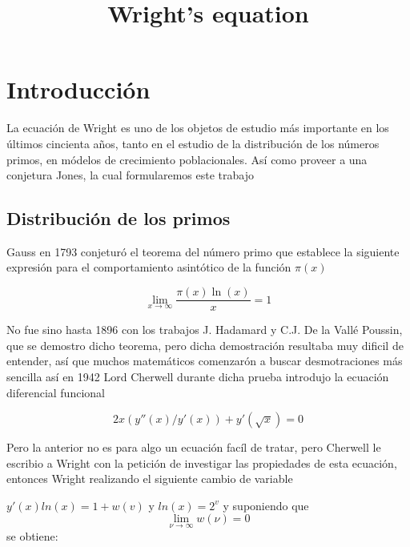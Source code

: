 \documentclass[11pt]{article}
\title{Wright's equation}
\begin{document}
    
    
    \maketitle
    
    

    
    \hypertarget{introducciuxf3n}{%
\section{Introducción}\label{introducciuxf3n}}

La ecuación de Wright es uno de los objetos de estudio más importante en
los últimos cincienta años, tanto en el estudio de la distribución de
los números primos, en módelos de crecimiento poblacionales. Así como
proveer a una conjetura Jones, la cual formularemos este trabajo

\hypertarget{distribuciuxf3n-de-los-primos}{%
\subsection{Distribución de los
primos}\label{distribuciuxf3n-de-los-primos}}

Gauss en 1793 conjeturó el teorema del número primo que establece la
siguiente expresión para el comportamiento asintótico de la función
\(\pi(x)\)

\begin{equation}
\lim_{x \rightarrow \infty} \dfrac{\pi(x)\ln(x)}{x} = 1 
\end{equation}

No fue sino hasta 1896 con los trabajos J. Hadamard y C.J. De la Vallé
Poussin, que se demostro dicho teorema, pero dicha demostración
resultaba muy dificil de entender, así que muchos matemáticos comenzarón
a buscar desmotraciones más sencilla así en 1942 Lord Cherwell durante
dicha prueba introdujo la ecuación diferencial funcional

\begin{equation}
2x(y''(x)/y'(x)) + y'(\sqrt{x}) = 0
\end{equation}

Pero la anterior no es para algo un ecuación facíl de tratar, pero
Cherwell le escribio a Wright con la petición de investigar las
propiedades de esta ecuación, entonces Wright realizando el siguiente
cambio de variable

\(y′(x)ln(x) = 1+w(v)\) y \(ln(x) = 2^v\) y suponiendo que
\[\displaystyle \lim_{\nu \rightarrow \infty} w(\nu) = 0\] se obtiene:
\end{document}
